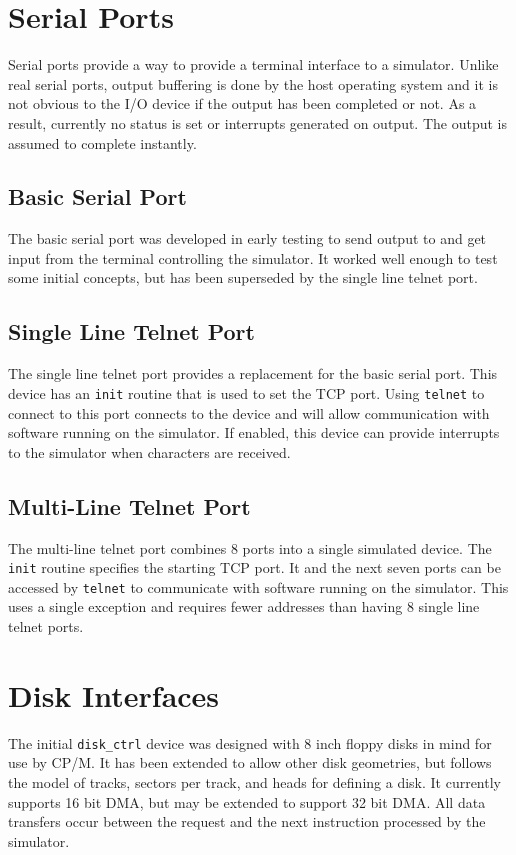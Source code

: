 \documentclass[10pt, openany]{book}
\begin{document}
\section{Serial Ports}
Serial ports provide a way to provide a terminal interface to a simulator.  Unlike real serial ports, output buffering is done by the host operating system and it is not obvious to the I/O device if the output has been completed or not.  As a result, currently no status is set or interrupts generated on output.  The output is assumed to complete instantly.

\subsection{Basic Serial Port}
The basic serial port was developed in early testing to send output to and get input from the terminal controlling the simulator.  It worked well enough to test some initial concepts, but has been superseded by the single line telnet port.
\subsection{Single Line Telnet Port}
The single line telnet port provides a replacement for the basic serial port.  This device has an \verb|init| routine that is used to set the TCP port.  Using \verb|telnet| to connect to this port connects to the device and will allow communication with software running on the simulator.  If enabled, this device can provide interrupts to the simulator when characters are received.
\subsection{Multi-Line Telnet Port}
The multi-line telnet port combines 8 ports into a single simulated device.  The \verb|init| routine specifies the starting TCP port.  It and the next seven ports can be accessed by \verb|telnet| to communicate with software running on the simulator.  This uses a single exception and requires fewer addresses than having 8 single line telnet ports.

\section{Disk Interfaces}
The initial \verb|disk_ctrl| device was designed with 8 inch floppy disks in mind for use by CP/M.  It has been extended to allow other disk geometries, but follows the model of tracks, sectors per track, and heads for defining a disk.  It currently supports 16 bit DMA, but may be extended to support 32 bit DMA.  All data transfers occur between the request and the next instruction processed by the simulator.
\end{document}

